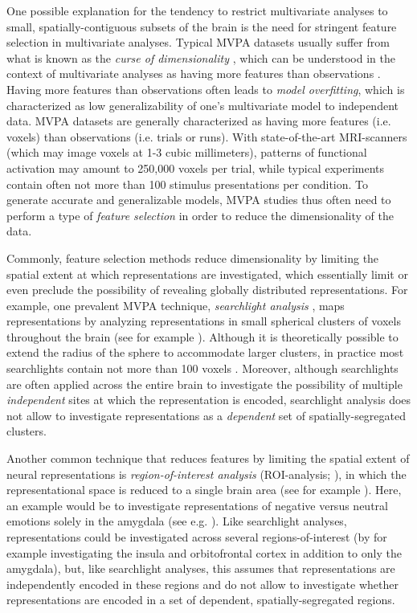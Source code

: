 \documentclass[jou,12pt,a4paper]{apa6}
\begin{document}
One possible explanation for the tendency to restrict multivariate analyses to small, spatially-contiguous subsets of the brain is the need for stringent feature selection in multivariate analyses. Typical MVPA datasets usually suffer from what is known as the \emph{curse of dimensionality} \cite{haynes2015}, which can be understood in the context of multivariate analyses as having more features than observations \cite{mahmoudi2012}. Having more features than observations often leads to \emph{model overfitting}, which is characterized as low generalizability of one's multivariate model to independent data. MVPA datasets are generally characterized as having more features (i.e. voxels) than observations (i.e. trials or runs). With state-of-the-art MRI-scanners (which may image voxels at 1-3 cubic millimeters), patterns of functional activation may amount to 250,000 voxels per trial, while typical experiments contain often not more than 100 stimulus presentations per condition. To generate accurate and generalizable models, MVPA studies thus often need to perform a type of \emph{feature selection} in order to reduce the dimensionality of the data.

Commonly, feature selection methods reduce dimensionality by limiting the spatial extent at which representations are investigated, which essentially limit or even preclude the possibility of revealing globally distributed representations. For example, one prevalent MVPA technique, \emph{searchlight analysis} \cite{kriegeskorte2006}, maps representations by analyzing representations in small spherical clusters of voxels throughout the brain (see for example ). Although it is theoretically possible to extend the radius of the sphere to accommodate larger clusters, in practice most searchlights contain not more than 100 voxels \cite{etzel2013}. Moreover, although searchlights are often applied across the entire brain to investigate the possibility of multiple \emph{independent} sites at which the representation is encoded, searchlight analysis does not allow to investigate representations as a \emph{dependent} set of spatially-segregated clusters. 

Another common technique that reduces features by limiting the spatial extent of neural representations is \emph{region-of-interest analysis} (ROI-analysis; ), in which the representational space is reduced to a single brain area (see for example ). Here, an example would be to investigate representations of negative versus neutral emotions solely in the amygdala (see e.g. ). Like searchlight analyses, representations could be investigated across several regions-of-interest (by for example investigating the insula and orbitofrontal cortex in addition to only the amygdala), but, like searchlight analyses, this assumes that representations are independently encoded in these regions and do not allow to investigate whether representations are encoded in a set of dependent, spatially-segregated regions.
\end{document}
